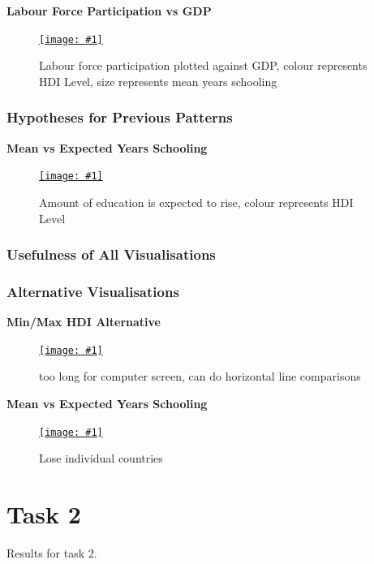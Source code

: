 \documentclass[11pt,a4paper,final]{article}
\newcommand\onlinefig[3]{
\begin{figure}[H]
  \centering
  \href{#3}{\texttt{[image: \#1]}}
  \caption{#2} 
  \label{fig:#1}
\end{figure}
}
\begin{document}
\begin{multicols}{2}
\begin{flushleft}
\textbf{Labour Force Participation vs GDP}
\end{flushleft}
\onlinefig{labour_force_participation_vs_gdp_scatterplot}{Labour force participation plotted against GDP, colour represents HDI Level, size represents mean years schooling}{https://public.tableau.com/views/CS3205-HDI/Sheet13?:language=en-GB&:display_count=n&:origin=viz_share_link}

\subsubsection{Hypotheses for Previous Patterns}
\begin{flushleft}
\textbf{Mean vs Expected Years Schooling}
\end{flushleft}
\vspace{-2cm}
\onlinefig{mean_vs_expected_years_schooling_scatterplot.png}{Amount of education is expected to rise, colour represents HDI Level}{https://public.tableau.com/views/CS3205-HDI/Sheet7?:language=en-GB&:display_count=n&:origin=viz_share_link}

\subsubsection{Usefulness of All Visualisations}


\subsubsection{Alternative Visualisations}
\begin{flushleft}
\textbf{Min/Max HDI Alternative}
\end{flushleft}
\onlinefig{min_vs_max_hdi_sidebysidecircleplot}{too long for computer screen, can do horizontal line comparisons}{https://public.tableau.com/views/CS3205_hdi_csv/Sheet1?:language=en-GB&:display_count=n&:origin=viz_share_link}

\begin{flushleft}
\textbf{Mean vs Expected Years Schooling}
\end{flushleft}
\onlinefig{mean_vs_expected_years_schooling_bar_and_linegraph}{Lose individual countries}{https://public.tableau.com/views/CS3205-HDI/Sheet4?:language=en-GB&:display_count=n&:origin=viz_share_link}

\end{multicols}
\pagebreak


\section{Task 2}
Results for task 2.
\end{document}
